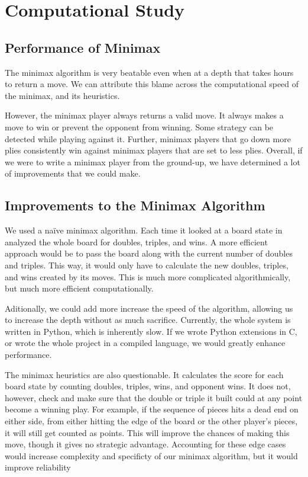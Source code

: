 \documentclass[12pt]{article}
\begin{document}
\section{Computational Study}
\subsection{Performance of Minimax}
The minimax algorithm is very beatable even when at a depth that takes hours to return a move. We can attribute this blame across the computational speed of the minimax, and its heuristics. 

However, the minimax player always returns a valid move. It always makes a move to win or prevent the opponent from winning. Some strategy can be detected while playing against it. Further, minimax players that go down more plies consistently win against minimax players that are set to less plies. Overall, if we were to write a minimax player from the ground-up, we have determined a lot of improvements that we could make.



\subsection{Improvements to the Minimax Algorithm}
We used a na{\"i}ve minimax algorithm. Each time it looked at a board state in analyzed the whole board for doubles, triples, and wins. A more efficient approach would be to pass the board along with the current number of doubles and triples. This way, it would only have to calculate the new doubles, triples, and wins created by its moves. This is much more complicated algorithmically, but much more efficient computationally. 

Aditionally, we could add more increase the speed of the algorithm, allowing us to increase the depth without as much sacrifice. Currently, the whole system is written in Python, which is inherently slow. If we wrote Python extensions in C, or wrote the whole project in a compiled language, we would greatly enhance performance.

The minimax heuristics are also questionable. It calculates the score for each board state by counting doubles, triples, wins, and opponent wins. It does not, however, check and make sure that the double or triple it built could at any point become a winning play. For example, if the sequence of pieces hits a dead end on either side, from either hitting the edge of the board or the other player’s pieces, it will still get counted as points. This will improve the chances of making this move, though it gives no strategic advantage. Accounting for these edge cases would increase complexity and specificty of our minimax algorithm, but it would improve reliability
\end{document}
